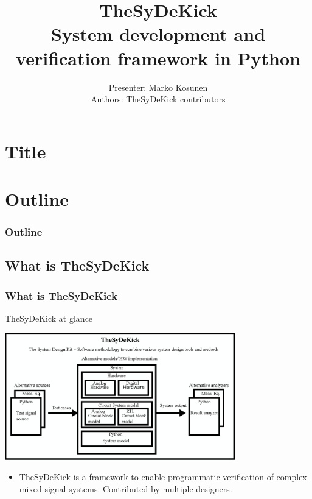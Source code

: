 \documentclass{sdkslides}
\title{\Huge{TheSyDeKick}\\ \vspace{0.2in} \normalsize{System development and
verification framework in Python}}
\author{Presenter: Marko Kosunen \\Authors: TheSyDeKick contributors}
\date{\lectdate}
\newcommand{\sectname}{Section Name}
\begin{document}
\section*{Title}
\sdktitleframe

\section*{Outline}
\begin{frame}[c]
    \frametitle{Outline}
    \tableofcontents
\end{frame}




\renewcommand{\sectname}{What is TheSyDeKick}
\subsection*{\sectname}
\begin{frame}[t]
    \frametitle{\sectname}
    \begin{block}{TheSyDeKick at glance}
        \begin{center}
            \includegraphics[width=0.75\textwidth]{Pics/TheSDK_block_diagram.eps}
        \end{center}
    \end{block}
    \begin{itemize}
        \item TheSyDeKick is a framework to enable programmatic
            verification of complex mixed signal systems. Contributed by
            multiple designers.
    \end{itemize}
\end{frame}
\end{document}
